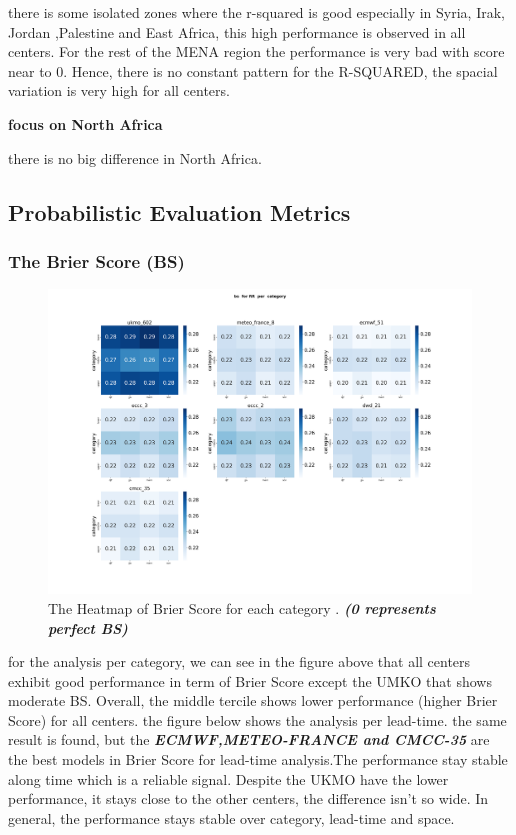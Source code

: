there is some isolated zones where the r-squared is good especially in Syria, Irak, Jordan ,Palestine  and East Africa, this high performance is observed in all centers. For the rest of the MENA region the performance is very bad with score near to 0. Hence, there is no constant pattern for the R-SQUARED, the spacial variation is very high for all centers.

\vspace{1.5cm}
\textbf{focus on North Africa}

there is no big difference in North Africa.


\subsection{Probabilistic Evaluation Metrics}

\subsubsection{The Brier Score (BS)}

\begin{figure}[H]
    \centering
    \includegraphics[scale=0.25]{plots/prob/bs/bs_RR_category.png}
    \caption{The Heatmap of Brier Score for each category  . \textbf{\textit{(0 represents perfect BS)}}}
\end{figure}

for the analysis per category, we can see in the figure above that all centers exhibit good performance in term of Brier Score except the UMKO that shows moderate BS. Overall, the middle tercile shows lower performance (higher Brier Score) for all centers. 
the figure below shows the analysis per lead-time. the same result is found, but the \textbf{\textit{ECMWF,METEO-FRANCE and CMCC-35}} are the best models in Brier Score for lead-time analysis.The performance stay stable along time which is a reliable signal. Despite the UKMO have the lower performance, it stays close to the other centers, the difference isn't so wide. 
In general, the performance stays stable over category, lead-time and space.


